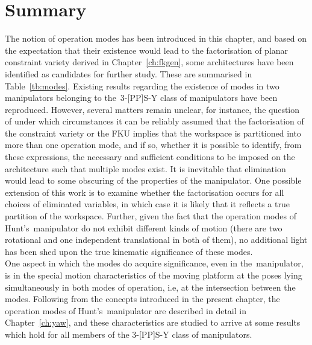 \documentclass[DD]{iitmdiss}
\newcommand{\mref}[1]{\ref{#1}}
\begin{document}
\section{Summary}
%
The notion of operation modes has been introduced in this chapter, and based on the expectation that their existence would lead to the factorisation of planar constraint variety derived in Chapter~\mref{ch:fkgen}, some architectures have been identified as candidates for further study. These are summarised in Table~\mref{tb:modes}. Existing results regarding the existence of modes in two manipulators belonging to the~3-[PP]S-Y class of manipulators have been reproduced. However, several matters remain unclear, for instance, the question of under which circumstances it can be reliably assumed that the factorisation of the constraint variety or the FKU implies that the workspace is partitioned into more than one operation mode, and if so, whether it is possible to identify, from these expressions, the necessary and sufficient conditions to be imposed on the architecture such that multiple modes exist. It is inevitable that elimination would lead to some obscuring of the properties of the manipulator. One possible extension of this work is to examine whether the factorisation occurs for all choices of eliminated variables, in which case it is likely that it reflects a true partition of the workspace. Further, given the fact that the operation modes of Hunt's~\rps manipulator do not exhibit different kinds of motion (there are two rotational \dofs and one independent translational \dof in both of them), no additional light has been shed upon the true kinematic significance of these modes.\\
One aspect in which the modes do acquire significance, even in the~\rps manipulator, is in the special motion characteristics of the moving platform at the poses lying simultaneously in both modes of operation, i.e, at the intersection between the modes. Following from the concepts introduced in the present chapter, the operation modes of Hunt's~\rps manipulator are described in detail in Chapter~\mref{ch:yaw}, and these characteristics are studied to arrive at some results which hold for all members of the 3-[PP]S-Y class of manipulators.
\end{document}
